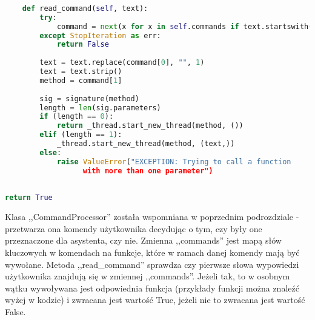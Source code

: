 \begin{lstlisting}[language=Python]
	
    def read_command(self, text):
        try:
            command = next(x for x in self.commands if text.startswith(x[0]))
        except StopIteration as err:
            return False
        
        text = text.replace(command[0], "", 1)
        text = text.strip()
        method = command[1]
           
        sig = signature(method)
        length = len(sig.parameters)
        if (length == 0):
            return _thread.start_new_thread(method, ())
        elif (length == 1):
            _thread.start_new_thread(method, (text,))
        else:
            raise ValueError("EXCEPTION: Trying to call a function
			      with more than one parameter") 
        
        
return True


\end{lstlisting} 

Klasa ,,CommandProcessor'' została wspomniana w poprzednim podrozdziale - przetwarza ona komendy użytkownika decydując o tym, czy były one przeznaczone dla 
asystenta, czy nie. Zmienna ,,commands'' jest mapą słów kluczowych w komendach
na funkcje, które w ramach danej komendy mają być wywołane. Metoda ,,read\_command'' sprawdza czy pierwsze słowa wypowiedzi użytkownika 
znajdują się w zmiennej ,,commands''. Jeżeli tak, to w osobnym wątku wywoływana jest odpowiednia funkcja (przykłady funkcji można znaleźć wyżej w kodzie)
i zwracana jest wartość True, jeżeli nie to zwracana jest wartość False.
